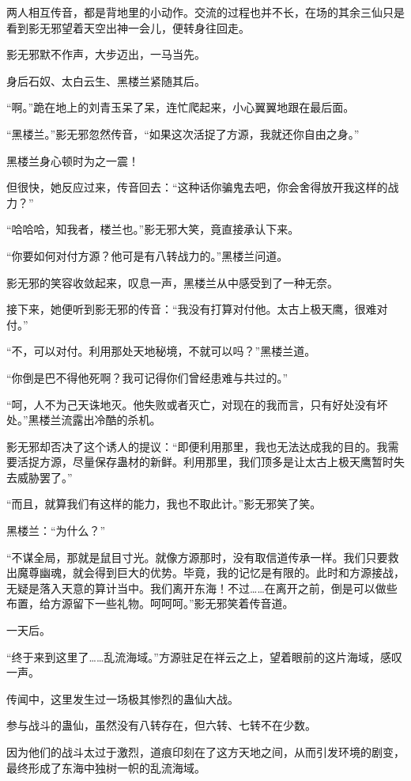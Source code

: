 \begin{this_body}
两人相互传音，都是背地里的小动作。交流的过程也并不长，在场的其余三仙只是看到影无邪望着天空出神一会儿，便转身往回走。

影无邪默不作声，大步迈出，一马当先。

身后石奴、太白云生、黑楼兰紧随其后。

“啊。”跪在地上的刘青玉呆了呆，连忙爬起来，小心翼翼地跟在最后面。

“黑楼兰。”影无邪忽然传音，“如果这次活捉了方源，我就还你自由之身。”

黑楼兰身心顿时为之一震！

但很快，她反应过来，传音回去：“这种话你骗鬼去吧，你会舍得放开我这样的战力？”

“哈哈哈，知我者，楼兰也。”影无邪大笑，竟直接承认下来。

“你要如何对付方源？他可是有八转战力的。”黑楼兰问道。

影无邪的笑容收敛起来，叹息一声，黑楼兰从中感受到了一种无奈。

接下来，她便听到影无邪的传音：“我没有打算对付他。太古上极天鹰，很难对付。”

“不，可以对付。利用那处天地秘境，不就可以吗？”黑楼兰道。

“你倒是巴不得他死啊？我可记得你们曾经患难与共过的。”

“呵，人不为己天诛地灭。他失败或者灭亡，对现在的我而言，只有好处没有坏处。”黑楼兰流露出冷酷的杀机。

影无邪却否决了这个诱人的提议：“即便利用那里，我也无法达成我的目的。我需要活捉方源，尽量保存蛊材的新鲜。利用那里，我们顶多是让太古上极天鹰暂时失去威胁罢了。”

“而且，就算我们有这样的能力，我也不取此计。”影无邪笑了笑。

黑楼兰：“为什么？”

“不谋全局，那就是鼠目寸光。就像方源那时，没有取信道传承一样。我们只要救出魔尊幽魂，就会得到巨大的优势。毕竟，我的记忆是有限的。此时和方源接战，无疑是落入天意的算计当中。我们离开东海！不过……在离开之前，倒是可以做些布置，给方源留下一些礼物。呵呵呵。”影无邪笑着传音道。

一天后。

“终于来到这里了……乱流海域。”方源驻足在祥云之上，望着眼前的这片海域，感叹一声。

传闻中，这里发生过一场极其惨烈的蛊仙大战。

参与战斗的蛊仙，虽然没有八转存在，但六转、七转不在少数。

因为他们的战斗太过于激烈，道痕印刻在了这方天地之间，从而引发环境的剧变，最终形成了东海中独树一帜的乱流海域。


\end{this_body}
